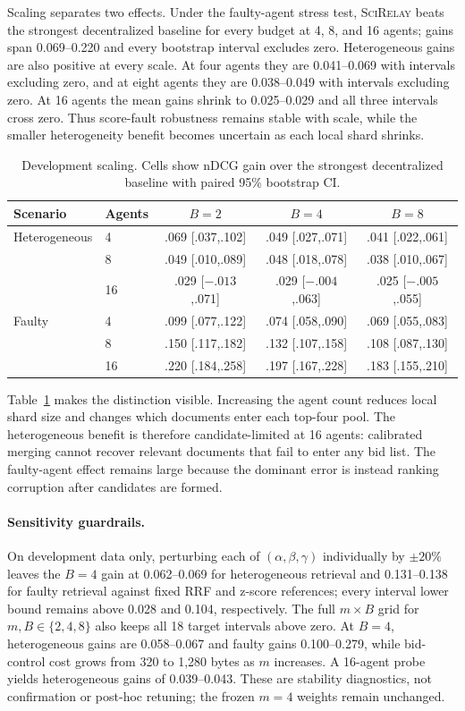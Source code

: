 \documentclass[sigconf]{acmart}
\newcommand{\method}{\textsc{SciRelay}}
\newcommand{\ndcg}{nDCG}
\begin{document}
Scaling separates two effects. Under the faulty-agent stress test, \method{} beats the strongest decentralized baseline for every budget at 4, 8, and 16 agents; gains span 0.069--0.220 and every bootstrap interval excludes zero. Heterogeneous gains are also positive at every scale. At four agents they are 0.041--0.069 with intervals excluding zero, and at eight agents they are 0.038--0.049 with intervals excluding zero. At 16 agents the mean gains shrink to 0.025--0.029 and all three intervals cross zero. Thus score-fault robustness remains stable with scale, while the smaller heterogeneity benefit becomes uncertain as each local shard shrinks.

\begin{table}[t]
\caption{Development scaling. Cells show \ndcg{} gain over the strongest decentralized baseline with paired 95\% bootstrap CI.}
\label{tab:scaling}
\centering
\small
\setlength{\tabcolsep}{7pt}
\begin{tabular}{llccc}
\toprule
Scenario & Agents & $B=2$ & $B=4$ & $B=8$ \\
\midrule
Heterogeneous & 4  & .069 [.037,.102] & .049 [.027,.071] & .041 [.022,.061] \\
 & 8  & .049 [.010,.089] & .048 [.018,.078] & .038 [.010,.067] \\
 & 16 & .029 [$-.013$,.071] & .029 [$-.004$,.063] & .025 [$-.005$,.055] \\
Faulty & 4  & .099 [.077,.122] & .074 [.058,.090] & .069 [.055,.083] \\
 & 8  & .150 [.117,.182] & .132 [.107,.158] & .108 [.087,.130] \\
 & 16 & .220 [.184,.258] & .197 [.167,.228] & .183 [.155,.210] \\
\bottomrule
\end{tabular}
\end{table}

Table~\ref{tab:scaling} makes the distinction visible. Increasing the agent count reduces local shard size and changes which documents enter each top-four pool. The heterogeneous benefit is therefore candidate-limited at 16 agents: calibrated merging cannot recover relevant documents that fail to enter any bid list. The faulty-agent effect remains large because the dominant error is instead ranking corruption after candidates are formed.

\paragraph{Sensitivity guardrails.}
On development data only, perturbing each of $(\alpha,\beta,\gamma)$ individually by $\pm20\%$ leaves the $B=4$ gain at 0.062--0.069 for heterogeneous retrieval and 0.131--0.138 for faulty retrieval against fixed RRF and z-score references; every interval lower bound remains above 0.028 and 0.104, respectively. The full $m\times B$ grid for $m,B\in\{2,4,8\}$ also keeps all 18 target intervals above zero. At $B=4$, heterogeneous gains are 0.058--0.067 and faulty gains 0.100--0.279, while bid-control cost grows from 320 to 1,280 bytes as $m$ increases. A 16-agent probe yields heterogeneous gains of 0.039--0.043. These are stability diagnostics, not confirmation or post-hoc retuning; the frozen $m=4$ weights remain unchanged.
\end{document}
